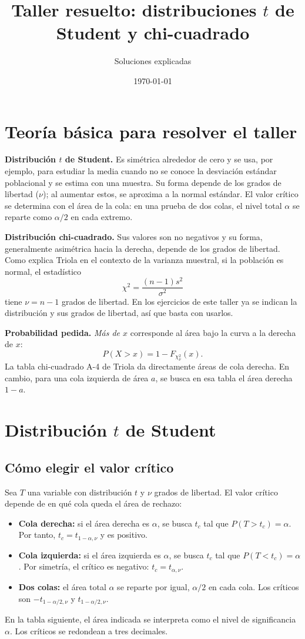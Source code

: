 \documentclass[11pt]{article}
\title{Taller resuelto: distribuciones $t$ de Student y chi-cuadrado}
\author{Soluciones explicadas}
\date{\today}
\begin{document}
\maketitle

\section*{Teoría básica para resolver el taller}

\textbf{Distribución $t$ de Student.} Es simétrica alrededor de cero y se usa, por ejemplo, para estudiar la media cuando no se conoce la desviación estándar poblacional y se estima con una muestra. Su forma depende de los grados de libertad ($\nu$); al aumentar estos, se aproxima a la normal estándar. El valor crítico se determina con el área de la cola: en una prueba de dos colas, el nivel total $\alpha$ se reparte como $\alpha/2$ en cada extremo.

\textbf{Distribución chi-cuadrado.} Sus valores son no negativos y su forma, generalmente asimétrica hacia la derecha, depende de los grados de libertad. Como explica Triola en el contexto de la varianza muestral, si la población es normal, el estadístico
\[
\chi^2=\frac{(n-1)s^2}{\sigma^2}
\]
tiene $\nu=n-1$ grados de libertad. En los ejercicios de este taller ya se indican la distribución y sus grados de libertad, así que basta con usarlos.

\textbf{Probabilidad pedida.} \emph{Más de $x$} corresponde al área bajo la curva a la derecha de $x$:
\[
P(X>x)=1-F_{\chi^2_\nu}(x).
\]
La tabla chi-cuadrado A-4 de Triola da directamente áreas de cola derecha. En cambio, para una cola izquierda de área $a$, se busca en esa tabla el área derecha $1-a$.

\section{Distribución $t$ de Student}

\subsection{Cómo elegir el valor crítico}
Sea $T$ una variable con distribución $t$ y $\nu$ grados de libertad. El valor crítico depende de en qué cola queda el área de rechazo:
\begin{itemize}
  \item \textbf{Cola derecha:} si el área derecha es $\alpha$, se busca $t_c$ tal que $P(T>t_c)=\alpha$. Por tanto, $t_c=t_{1-\alpha,\nu}$ y es positivo.
  \item \textbf{Cola izquierda:} si el área izquierda es $\alpha$, se busca $t_c$ tal que $P(T<t_c)=\alpha$. Por simetría, el crítico es negativo: $t_c=t_{\alpha,\nu}$.
  \item \textbf{Dos colas:} el área total $\alpha$ se reparte por igual, $\alpha/2$ en cada cola. Los críticos son $-t_{1-\alpha/2,\nu}$ y $t_{1-\alpha/2,\nu}$.
\end{itemize}
En la tabla siguiente, el área indicada se interpreta como el nivel de significancia $\alpha$. Los críticos se redondean a tres decimales.
\end{document}

